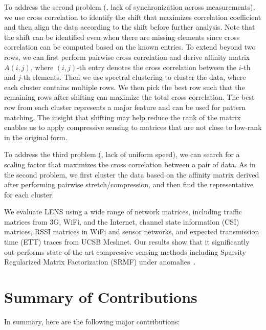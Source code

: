 To address the second problem (\ie, lack of synchronization across measurements), we use cross correlation to identify the shift that maximizes correlation coefficient and then align the data according to the shift before further analysis. Note that the shift can be identified even when there are missing elements since cross correlation can be computed based on the known entries. To extend beyond two rows, we can first perform pairwise cross correlation and derive affinity matrix $A(i, j)$, where $(i, j)$-th entry denotes the cross correlation between the $i$-th and $j$-th elements. Then we use spectral clustering to cluster the data, where each cluster contains multiple rows. We then pick the best row such that the remaining rows after shifting can maximize the total cross correlation. The best row from each cluster represents a major feature and can be used for pattern matching. The insight that shifting may help reduce the rank of the matrix enables us to apply compressive sensing to matrices that are not close to low-rank in the original form.

To address the third problem (\ie, lack of uniform speed), we can search for a scaling factor that maximizes the cross correlation between a pair of data. As in the second problem, we first cluster the data based on the affinity matrix derived after performing pairwise stretch/compression, and then find the representative for each cluster. 

We evaluate LENS using a wide range of network matrices, including traffic matrices from 3G, WiFi, and the Internet, channel state information (CSI) matrices, RSSI matrices in WiFi and sensor networks, and expected transmission time (ETT) traces from UCSB Meshnet. Our results show that it significantly out-performs state-of-the-art compressive sensing methods including Sparsity Regularized Matrix Factorization (SRMF) under anomalies~\cite{zhang09sensing}. 


\section{Summary of Contributions}
\label{sec:contribution}

In summary, here are the following major contributions:

